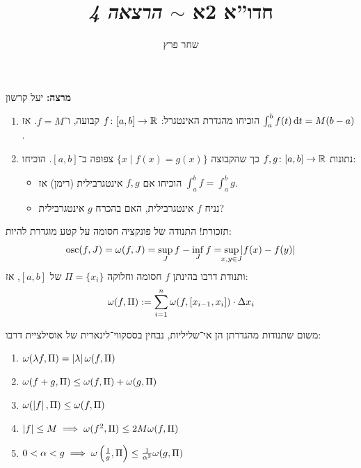 \documentclass[]{../../../../tex/classes/styledArticle}
\author{שחר פרץ}
\title{חדו''א 2א $\sim$ \textit{הרצאה 4}}
\begin{document}
	\maketitle
	
	\textbf{מרצה: }יעל קרשון 
	
	
	\begin{Exercise}
		\begin{enumerate}
			\item הוכיחו מהגדרת האינטגרל: $f \colon [a, b] \to \mathbb{R}$ קבועה, ו־$f = M$. אז $\int^b_a f(t) \,\mathrm{d}t = M(b - a)$. 
			\item נתונות $f, g \colon [a, b] \to \mathbb{R}$ כך שהקבוצה $\{x \mid f(x) = g(x)\}$ צפופה ב־$[a, b]$. הוכיחו: 
			\begin{itemize}[A.]
				\item הוכיחו אם $f, g$ אינטגרבילית (רימן) אז $\int^b_a f = \int^b_a g$. 
				\item נניח $f$ אינטגרבילית, האם בהכרח $g$ אינטגרבילית?
			\end{itemize}
		\end{enumerate}
	\end{Exercise}
	

	תזכורת! התנודה של פונקציה חסומה על קטע מוגדרת להיות: 
	\[ \mathrm{osc}(f, J) = \wg(f, J) = \sup_J f - \inf_J f = \sup_{\mathclap{x, y \in J}} \sof{f(x) - f(y)} \]
	ותנודת דרבו בהינתן $f$ חסומה וחלוקה $\Pi = \{x_i\}$ של $[a, b]$, אז: 
	\[ \omega(f, \Pi) := \sum_{i = 1}^{n}\omega(f, [x_{i - 1}, x_i]) \cdot \Delta x_i \]
	\begin{Collary}
		משום שתנודות מהגדרתן הן אי־שליליות, נבחין בססקווי־לינארית של אוסילציית דרבו: 
		\begin{enumerate}
			\item \hfil $\omega(\lambda f, \Pi) = \left \lvert \lambda \right \rvert \omega(f, \Pi)$
			\item \hfil $\omega(f + g, \Pi) \le \omega(f, \Pi) + \omega(g, \Pi)$
			\item \hfil $\omega(\left \lvert f \right \rvert, \Pi) \le \omega(f, \Pi)$
			\item \hfil $\left \lvert f \right \rvert \le M \implies \omega(f^{2}, \Pi) \le 2M\omega(f, \Pi)$
			\item \hfil $0 < \alpha < g \implies \omega\left ( \frac{1}{g}, \Pi \right ) \le \frac{1}{\alpha^{2}}\omega(g, \Pi)$
		\end{enumerate}
	\end{Collary}
	
\end{document}

